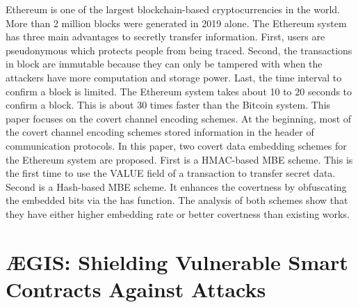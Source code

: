 \documentclass{article}
\begin{document}
Ethereum is one of the largest blockchain-based cryptocurrencies in the world. More than 2 million blocks were generated in 2019 alone. The Ethereum system has three main advantages to secretly transfer information. First, users are pseudonymous which protects people from being traced. Second, the transactions in block are immutable because they can only be tampered with when the attackers have more computation and storage power. Last, the time interval to confirm a block is limited. The Ethereum system takes about 10 to 20 seconds to confirm a block. This is about 30 times faster than the Bitcoin system. This paper focuses on the covert channel encoding schemes. At the beginning, most of the covert channel encoding schemes stored information in the header of communication protocols. In this paper, two covert data embedding schemes for the Ethereum system are proposed. First is a HMAC-based MBE scheme. This is the first time to use the VALUE field of a transaction to transfer secret data. Second is a Hash-based MBE scheme. It enhances the covertness by obfuscating the embedded bits via the has function. The analysis of both schemes show that they have either higher embedding rate  or better covertness than existing works. 

\section{ÆGIS: Shielding Vulnerable Smart Contracts Against Attacks \cite{Aegis}}
\end{document}
